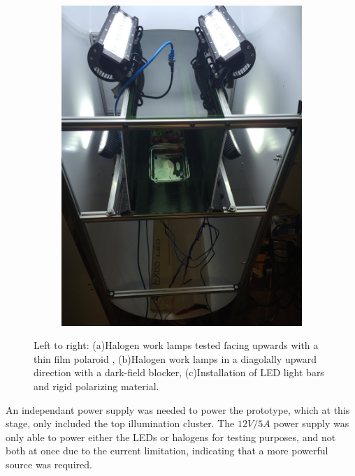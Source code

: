 \documentclass[fleqn,twoside]{article}
\begin{document}
\begin{figure}[h]
\begin{subfigure}{.32\textwidth}
		\includegraphics[width=\linewidth,angle=270,origin=c]{bench_led_rigid.jpg}
		\caption{}
		\label{fig:bench_led_rigid}
	\end{subfigure}%
	
	\caption{Left to right: (a)Halogen work lamps tested facing upwards with a thin film polaroid , (b)Halogen work lamps in a diagolally upward direction with a dark-field blocker, (c)Installation of LED light bars and rigid polarizing material.}
	\label{fig:test3}
\end{figure}


An independant power supply was needed to power the prototype, which at this stage, only included the top illumination cluster. The $12V/5A$ power supply was only able to power either the LEDs or halogens for testing purposes, and not both at once due to the current limitation, indicating that a more powerful source was required.   
\end{document}
